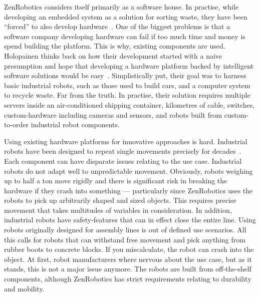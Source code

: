 \documentclass[english]{tktltiki2}
\begin{document}
ZenRobotics considers itself primarily as a software house. In practise, while developing an embedded system as a solution for sorting waste, they have been “forced” to also develop hardware~\cite{Hol15a}. One of the biggest problems is that a software company developing hardware can fail if too much time and money is spend building the platform. This is why, existing components are used. Holopainen thinks back on how their development started with a naive presumption and hope that developing a hardware platform backed by intelligent software solutions would be easy~\cite{Hol15a}. Simplistically put, their goal was to harness basic industrial robots, such as those used to build cars, and a computer system to recycle waste. Far from the truth. In practise, their solution requires multiple servers inside an air-conditioned shipping container, kilometres of cable, switches, custom-hardware including cameras and sensors, and robots built from custom-to-order industrial robot components.

Using existing hardware platforms for innovative approaches is hard. Industrial robots have been designed to repeat single movements precisely for decades~\cite{Hol15a}. Each component can have disparate issues relating to the use case. Industrial robots do not adapt well to unpredictable movement. Obviously, robots weighing up to half a ton move rigidly and there is significant risk in breaking the hardware if they crash into something — particularly since ZenRobotics uses the robots to pick up arbitrarily shaped and sized objects. This requires precise movement that takes multitudes of variables in consideration. In addition, industrial robots have safety-features that can in effect close the entire line. Using robots originally designed for assembly lines is out of defined use scenarios. All this calls for robots that can withstand free movement and pick anything from rubber boots to concrete blocks. If you miscalculate, the robot can crash into the object. At first, robot manufacturers where nervous about the use case, but as it stands, this is not a major issue anymore. The robots are built from off-the-shelf components, although ZenRobotics has strict requirements relating to durability and mobility.
\end{document}
